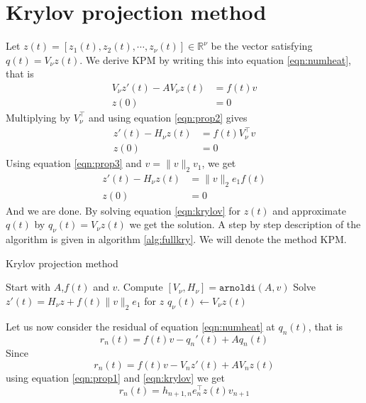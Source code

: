\section{Krylov projection method} \label{sec:fullKPM}

Let $z(t) = [z_1(t), z_2(t), \cdots, z_\nu(t)] \in \mathbb{R}^\nu $ be the vector satisfying $q(t) = V_\nu z(t)$. 
We derive KPM by writing this into equation \eqref{eqn:numheat}, that is
\begin{equation}  \begin{aligned} \label{eqn:KPMtemp1}
V_\nu z'(t) - A V_\nu z(t) &= f(t) v \\
z(0)& = 0
\end{aligned} \end{equation}
Multiplying by $V_\nu^{\top}$ and using equation \eqref{eqn:prop2} gives
\begin{equation*} 
\begin{aligned} \label{eqn:KPMtemp2}
z'(t)-H_\nu z(t) &= f(t) V_\nu^{\top}  v  \\
z(0)& = 0
\end{aligned}
\end{equation*}
Using equation \eqref{eqn:prop3} and $v = \|v \|_2 v_1 $, we get
\begin{equation} 
\begin{aligned} \label{eqn:krylov}
z'(t) -H_\nu z(t) &=  \|v \|_2 e_1 f(t)\\
z(0)& = 0
\end{aligned}
\end{equation}
And we are done. By solving equation \eqref{eqn:krylov} for $z(t)$ and approximate $q(t)$ by $ q_\nu(t) = V_\nu z(t) $ we get the solution. A step by step description of the algorithm is given in algorithm \ref{alg:fullkry}. 
 We will denote the method KPM.\\
\begin{algorithm}
\begin{algorithmic} \caption{Krylov projection method} \label{alg:fullkry} 
\STATE Start with $A$,$f(t)$ and $v$.
\STATE Compute $[V_\nu ,H_\nu] = \texttt{arnoldi}(A,v)$
\STATE Solve $  z'(t) = H_\nu z + f(t) \| v \|_2 e_1  $ for $z$
\STATE $ q_\nu (t) \leftarrow  V_\nu z(t) $
\end{algorithmic} 
\end{algorithm}

Let us now consider the residual of equation \eqref{eqn:numheat} at $q_n(t)$, that is
\begin{equation*}
r_n(t) = f(t) v - q_n'(t) +Aq_n(t)
\end{equation*}
Since
\begin{equation*}
r_n(t) = f(t)v -V_n z'(t) + A V_n z(t)
\end{equation*}
using equation \eqref{eqn:prop1} and \eqref{eqn:krylov} we get
\begin{equation} \label{eqn:rn}
r_n(t) = h_{n+1,n}e_n^\top z(t) v_{n+1}
\end{equation}

